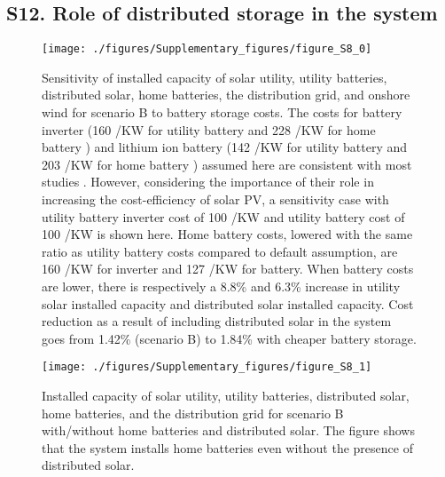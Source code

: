 \subsection*{S12. Role of distributed storage in the system}

\begin{figure}[H]
\renewcommand*{\thefigure}{S\arabic{figure}}

\texttt{[image: ./figures/Supplementary\_figures/figure\_S8\_0]}
\caption{Sensitivity of installed capacity of solar utility, utility batteries, distributed solar, home batteries, the distribution grid, and onshore wind for scenario B to battery storage costs. The costs for battery inverter (160 \texteuro /KW for utility battery  \protect{} and 228 \texteuro /KW for home battery  \protect{}) and lithium ion battery (142 \texteuro /KW for utility battery  \protect{} and 203 \texteuro /KW for home battery  \protect{}) assumed here are consistent with most studies  \protect{}. However, considering the importance of their role in increasing the cost-efficiency of solar PV, a sensitivity case with utility battery inverter cost of 100 \texteuro /KW  \protect{} and utility battery cost of 100 \texteuro /KW \protect{} is shown here. Home battery costs, lowered with the same ratio as utility battery costs compared to default assumption, are 160 \texteuro /KW for inverter and 127 \texteuro /KW for battery. When battery costs are lower, there is respectively a 8.8\% and 6.3\% increase in utility solar installed capacity and distributed solar installed capacity. Cost reduction as a result of including distributed solar in the system goes from 1.42\% (scenario B) to 1.84\% with cheaper battery storage. }
\end{figure}

\begin{figure}[H]
\renewcommand*{\thefigure}{S\arabic{figure}}

\texttt{[image: ./figures/Supplementary\_figures/figure\_S8\_1]}
\caption{Installed capacity of solar utility, utility batteries, distributed solar, home batteries, and the distribution grid for scenario B with/without home batteries and distributed solar. The figure shows that the system installs home batteries even without the presence of distributed solar.}
\end{figure}

